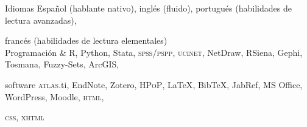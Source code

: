 





\begin{cvskills}

\cvskill
{Idiomas} 
{Español (hablante nativo), inglés (fluido), portugués (habilidades de lectura avanzadas),} 

\cvskill
{} 
{francés (habilidades de lectura elementales)} \\

\cvskill
{Programación \&} 
{R, Python, Stata, {\scshape spss/pspp}, {\scshape ucinet}, NetDraw, RSiena, Gephi, Tosmana, Fuzzy-Sets, ArcGIS,}

\cvskill
{software} 
{{\scshape atlas}.ti, EndNote, Zotero, {\scshape HPoP}, {\LaTeX}, Bib{\TeX}, JabRef, MS Office, WordPress, Moodle, {\scshape html},} 

\cvskill
{} 
{{\scshape css}, {\scshape xhtml}} \\

\end{cvskills}
